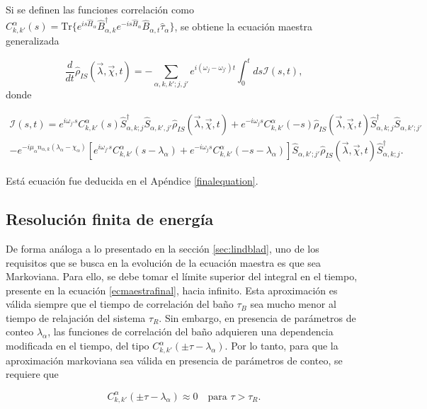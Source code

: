 Si se definen las funciones correlación como $C^{\alpha}_{k,k'}(s) = \text{Tr}\{e^{is\hat{H}_{\alpha} }\hat{B}^{\dagger}_{\alpha,k}e^{-is\hat{H}_{\alpha} }\hat{B}_{\alpha,t}\hat{\tau}_{\alpha}\}$, se obtiene la ecuación maestra generalizada

\begin{equation}
    \frac{d}{dt}\hat{\rho}_{IS}(\vec{\lambda},\vec{\chi},t) = - \sum_{\alpha,k,k';j,j'}e^{i(\omega_{j}-\omega_{j'})t}\int_{0}^{t}ds \mathcal{I}(s,t) ,
\label{ecmaestrafinal}
\end{equation}
donde

\begin{multline*}
    \mathcal{I}(s,t) = e^{i\omega_{j'}s} C^{\alpha}_{k,k'}(s)\hat{S}^{\dagger}_{\alpha,k;j}\hat{S}_{\alpha,k',j'}\hat{\rho}_{IS}(\vec{\lambda},\vec{\chi},t) + e^{-i\omega_{j}s}C^{\alpha}_{k,k'}(-s)\hat{\rho}_{IS}(\vec{\lambda},\vec{\chi},t)\hat{S}^{\dagger}_{\alpha,k;j}\hat{S}_{\alpha,k';j'} \\
    - e^{-i\mu_{\alpha}n_{\alpha,k}(\lambda_{\alpha} - \chi_{\alpha})}\left[e^{i\omega_{j'}s}C^{\alpha}_{k,k'}(s-\lambda_{\alpha}) + e^{-i\omega_{j}s}C^{\alpha}_{k,k'}(-s-\lambda_{\alpha})  \right]  \hat{S}_{\alpha,k';j'}\hat{\rho}_{IS}(\vec{\lambda},\vec{\chi},t)\hat{S}^{\dagger}_{\alpha,k;j}.
\end{multline*}

Está ecuación fue deducida en el Apéndice \ref{finalequation}.

\label{sec2:master}

\subsection{Resolución finita de energía}
De forma análoga a lo presentado en la sección \ref{sec:lindblad}, uno de los requisitos que se busca en la evolución de la ecuación maestra es que sea Markoviana. Para ello, se debe tomar el límite superior del integral en el tiempo, presente en la ecuación \ref{ecmaestrafinal}, hacia infinito. Esta aproximación es válida siempre que el tiempo de correlación del baño $\tau_{B}$ sea mucho menor al tiempo de relajación del sistema $\tau_{R}$. Sin embargo, en presencia de parámetros de conteo $\lambda_{\alpha}$, las funciones de correlación del baño adquieren una dependencia modificada en el tiempo, del tipo $C^{\alpha}_{k,k'}(\pm \tau - \lambda_\alpha)$. Por lo tanto, para que la aproximación markoviana sea válida en presencia de parámetros de conteo, se requiere que 

\begin{equation*}
    C^{\alpha}_{k,k'}(\pm \tau - \lambda_\alpha) \approx 0 \quad \text{para } \tau > \tau_{R}.
\end{equation*}

